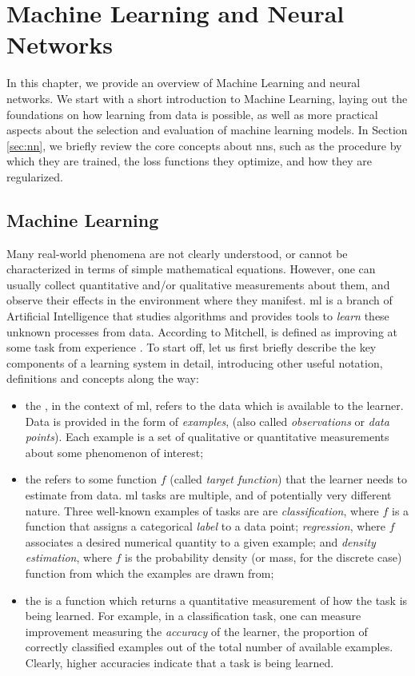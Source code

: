 \chapter{Machine Learning and Neural Networks}\label{ch:neural-networks} 
In this chapter, we provide an overview of Machine Learning and neural networks. We start with a short introduction to Machine Learning, laying out the foundations on how learning from data is possible, as well as more practical aspects about the selection and evaluation of machine learning models. In Section \ref{sec:nn}, we briefly review the core concepts about \glspl{nn}, such as the procedure by which they are trained, the loss functions they optimize, and how they are regularized.

\section{Machine Learning}\label{sec:ml}
Many real-world phenomena are not clearly understood, or cannot be characterized in terms of simple mathematical equations. However, one can usually collect quantitative and/or qualitative measurements about them, and observe their effects in the environment where they manifest. \gls{ml} is a branch of Artificial Intelligence that studies algorithms and provides tools to \emph{learn} these unknown processes from data. According to Mitchell,  is defined as improving at some task from experience \citep{mitchell}. To start off, let us first briefly describe the key components of a learning system in detail, introducing other useful notation, definitions and concepts along the way:

\begin{itemize}
    \item the , in the context of \gls{ml}, refers to
    the data which is available to the learner. Data is provided in the form
    of \emph{examples}, (also called \emph{observations} or \emph{data points}). Each example is a set of qualitative or quantitative measurements about some phenomenon of interest;
    \item the  refers to some function $f$ (called \emph{target function}) that the learner needs to estimate from data. \gls{ml} tasks are multiple, and of potentially very different nature. Three well-known examples of tasks are are \emph{classification}, where $f$ is a function that assigns a categorical \emph{label} to a data point; \emph{regression}, where $f$ associates a desired numerical quantity to a given example; and \emph{density estimation}, where $f$ is the probability density (or mass, for the discrete case) function from which the examples are drawn from;
    \item the  is a function which returns a quantitative measurement of how  the task is being learned. For example, in a classification task, one can measure improvement measuring the \emph{accuracy} of the learner, \ie the proportion of correctly classified examples out of the total number of available examples. Clearly, higher accuracies indicate that a task is being learned.
\end{itemize}


